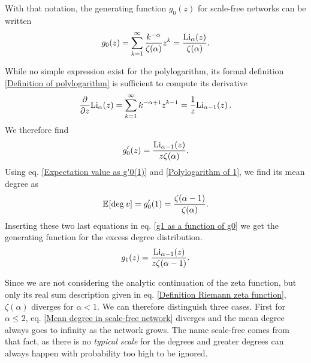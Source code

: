 \documentclass[
11pt, %
american, %
singlespacing, %
final, %
nolistspacing, %
liststotoc, %
headsepline, %
]{MastersDoctoralThesis} %
\begin{document}
With that notation, the generating function $g_0(z)$ for scale-free networks can be written
\begin{align}
	g_0(z) = \sum_{k=1}^\infty \frac{k^{-\alpha}}{\zeta(\alpha)} z^k = \frac{\mathrm{Li}_{\alpha}\!\left(z\right)}{\zeta(\alpha)}. \label{g0 for scale-free networks}
\end{align}

While no simple expression exist for the polylogarithm, its formal definition \eqref{Definition of polylogarithm} is sufficient to compute its derivative
\begin{align}
	\frac{\partial}{\partial z} \mathrm{Li}_{\alpha}\!\left(z\right) = \sum_{k = 1}^\infty k^{-\alpha + 1} z^{k-1} = \frac{1}{z} \mathrm{Li}_{\alpha - 1}\!\left(z\right). \label{Derivative of the polylogarithm}
\end{align}
We therefore find
\begin{align}
	g'_0(z) = \frac{\mathrm{Li}_{\alpha - 1}\!\left(z\right)}{z \zeta(\alpha)}.  \label{Derivative of g0 for scale-free networks}
\end{align}
Using eq. \eqref{Expectation value as g'0(1)} and \eqref{Polylogarithm of 1}, we find its mean degree as
\begin{align}
	\mathbb{E}_{}\!\left[ \mathrm{deg}_{}\, v \right] = g'_0(1) = \frac{\zeta(\alpha - 1)}{\zeta(\alpha)}. \label{Mean degree in scale-free network}
\end{align}
Inserting these two last equations in eq. \eqref{g1 as a function of g0} we get the generating function for the excess degree distribution.
\begin{align}
	g_1(z) =  \frac{\mathrm{Li}_{\alpha - 1}\!\left(z\right)}{z \zeta(\alpha - 1)}. \label{g1 for scale-free networks}
\end{align}

Since we are not considering the analytic continuation of the zeta function, but only its real sum description given in eq. \eqref{Definition Riemann zeta function}, $\zeta(\alpha)$ diverges for $\alpha < 1$. We can therefore distinguish three cases. First for $\alpha \leq 2$, eq. \eqref{Mean degree in scale-free network} diverges and the mean degree always goes to infinity as the network grows. The name scale-free comes from that fact, as there is no \emph{typical scale} for the degrees and greater degrees can always happen with probability too high to be ignored.
\end{document}

